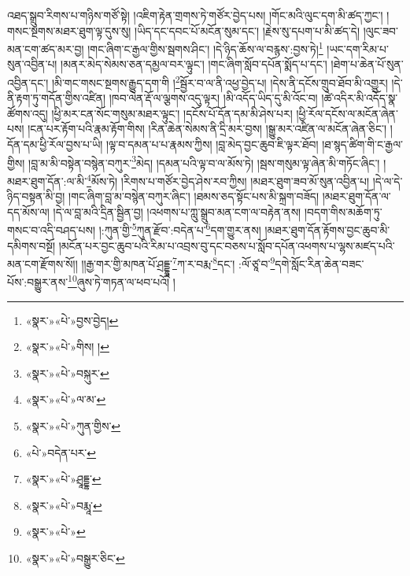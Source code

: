 འཐད་སྒྲུབ་རིགས་པ་གཉིས་གཙོ་སྟེ། །འཇིག་རྟེན་གྲགས་ཏེ་གཙོར་བྱེད་པས། །གོང་མའི་ལུང་དག་མི་ཚད་ཀྱང་། །གསང་སྔགས་མཐར་ཐུག་ལྟ་དུས་སུ། །ཡིད་དང་དབང་པོ་མངོན་སུམ་དང་། །རྗེས་སུ་དཔག་པ་མི་ཚད་དེ། །ལུང་ཟབ་མན་ངག་ཚད་མར་བྱ། །གང་ཞིག་ང་རྒྱལ་གྱིས་སྦགས་ཤིང་། །དེ་ཉིད་ཆོས་ལ་བརྙས་:བྱས་ཏེ།\footnote{«སྣར་»«པེ་»བྱས་བྱེད།} །ཡང་དག་རིམ་པ་སུན་འབྱིན་པ། །མནར་མེད་སེམས་ཅན་དམྱལ་བར་ལྟུང་། །གང་ཞིག་སློབ་དཔོན་སྨོད་པ་དང་། །ཐེག་པ་ཆེན་པོ་སུན་འབྱིན་དང་། །མི་གང་གསང་སྔགས་རྒྱུད་དག་གི །\footnote{«སྣར་»«པེ་»གིས། །}སྦྱོར་བ་ལ་ནི་འཕྱ་བྱེད་པ། །དེས་ནི་དངོས་གྲུབ་ཐོབ་མི་འགྱུར། །དེ་ནི་རྟག་ཏུ་གདོན་གྱིས་འཛིན། །ཁབ་ལེན་རྡོ་ལ་ལྕགས་འདུ་ལྟར། །མི་འདོད་ཡིད་དུ་མི་འོང་བ། །ཚེ་འདིར་མི་འདོད་སྣ་ཚོགས་འདུ། །ཕྱི་མར་ངན་སོང་གསུམ་མཐར་ལྟུང་། །དངོས་པོ་དོན་དམ་མི་ཤེས་པར། །ཕྱི་རོལ་དངོས་ལ་མངོན་ཞེན་པས། །ངན་པར་རྟོག་པའི་རྣམ་རྟོག་གིས། །རིན་ཆེན་སེམས་ནི་དྲི་མར་བྱས། །སྒྱུ་མར་འཛིན་ལ་མངོན་ཞེན་ཅིང་། །དོན་དམ་ཕྱི་རོལ་བྱས་པ་ཡི། །ལྟ་བ་དམན་པ་པ་རྣམས་ཀྱིས། །བླ་མེད་བྱང་ཆུབ་ཇི་ལྟར་ཐོབ། །ཐ་སྙད་ཚིག་གི་ང་རྒྱལ་གྱིས། །བླ་མ་མི་བསྟེན་བསྙེན་བཀུར་\footnote{«སྣར་»«པེ་»བསྐུར་}མེད། །དམན་པའི་ལྟ་བ་ལ་མོས་ཏེ། །སྦས་གསུམ་ལྟ་ཞེན་མི་གཏོང་ཞིང་། །མཐར་ཐུག་དོན་:ལ་མི་\footnote{«སྣར་»«པེ་»ལ་མ་}མོས་ཏེ། །རིགས་པ་གཙོར་བྱེད་ཤེས་རབ་ཀྱིས། །མཐར་ཐུག་ཟབ་མོ་སུན་འབྱིན་པ། །དེ་ལ་དེ་ཉིད་བསྟན་མི་བྱ། །གང་ཞིག་བླ་མ་བསྙེན་བཀུར་ཞིང་། །ཐམས་ཅད་སྟོང་པས་མི་སྐྲག་བཟོད། །མཐར་ཐུག་དོན་ལ་དད་མོས་ལ། །དེ་ལ་བླ་མའི་དྲིན་སྦྱིན་བྱ། །འཕགས་པ་ཀླུ་སྒྲུབ་མན་ངག་ལ་བརྟེན་ནས། །བདག་གིས་མཆོག་ཏུ་གསང་བ་འདི་བཤད་པས། །:ཀུན་གྱི་\footnote{«སྣར་»«པེ་»ཀུན་གྱིས་}ཀུན་རྫོབ་:བདེན་པ་\footnote{«པེ་»བདེན་པར་}དག་གྱུར་ནས། །མཐར་ཐུག་དོན་རྟོགས་བྱང་ཆུབ་མི་དམིགས་བསྔོ། །མངོན་པར་བྱང་ཆུབ་པའི་རིམ་པ་འབྲས་བུ་དང་བཅས་པ་སློབ་དཔོན་འཕགས་པ་ལྷས་མཛད་པའི་མན་ངག་རྫོགས་སོ།། །།རྒྱ་གར་གྱི་མཁན་པོ་ཤྲདྡྷཱ་\footnote{«སྣར་»«པེ་»ཤྲཱདྡྷ་}ཀ་ར་བརྨ་\footnote{«སྣར་»«པེ་»བརྨཱ་}དང་། :ལོ་ཙཱ་བ་\footnote{«སྣར་»«པེ་»}དགེ་སློང་རིན་ཆེན་བཟང་པོས་:བསྒྱུར་ནས་\footnote{«སྣར་»«པེ་»བསྒྱུར་ཅིང་}ཞུས་ཏེ་གཏན་ལ་ཕབ་པའོ། ། 